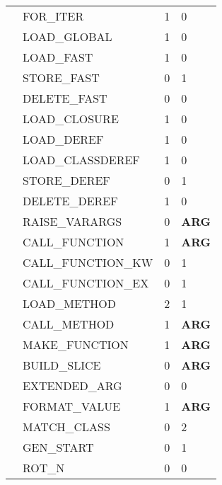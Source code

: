 \begin{longtable}{|p{4cm}|p{4cm}|p{2cm}|p{2cm}|  }
    \cline{2-4} & 
    FOR\_ITER&1&0\\
    
    \cline{2-4} & 
    LOAD\_GLOBAL&1&0\\
    
    \cline{2-4} & 
    LOAD\_FAST&1&0\\
    
    \cline{2-4} & 
    STORE\_FAST&0&1\\
    
    \cline{2-4} & 
    DELETE\_FAST&0&0\\
    
    \cline{2-4} & 
    LOAD\_CLOSURE&1&0\\
    
    \cline{2-4} & 
    LOAD\_DEREF&1&0\\
    
    \cline{2-4} & 
    LOAD\_CLASSDEREF&1&0\\
    
    \cline{2-4} & 
    STORE\_DEREF&0&1\\
    
    \cline{2-4} & 
    DELETE\_DEREF&1&0\\

    \cline{2-4} & 
    RAISE\_VARARGS&0&{\bfseries ARG}\\

    \cline{2-4} & 
    CALL\_FUNCTION&1&{\bfseries ARG}\\
    
    \cline{2-4} & 
    CALL\_FUNCTION\_KW&0&1\\
    
    \cline{2-4} & 
    CALL\_FUNCTION\_EX&0&1\\
    
    \cline{2-4} & 
    LOAD\_METHOD&2&1\\

    \cline{2-4} & 
    CALL\_METHOD&1&{\bfseries ARG}\\
    
    \cline{2-4} & 
    MAKE\_FUNCTION&1&{\bfseries ARG}\\
    
    \cline{2-4} & 
    BUILD\_SLICE&0&{\bfseries ARG}\\
    
    \cline{2-4} & 
    EXTENDED\_ARG&0&0\\
    
    \cline{2-4} & 
    FORMAT\_VALUE&1&{\bfseries ARG}\\
    
    \cline{2-4} & 
    MATCH\_CLASS&0&2\\
    
    \cline{2-4} & 
    GEN\_START&0&1\\
    
    \cline{2-4} & 
    ROT\_N&0&0\\

    \hline


\end{longtable}\label{table:opcode_table}
\pagebreak

